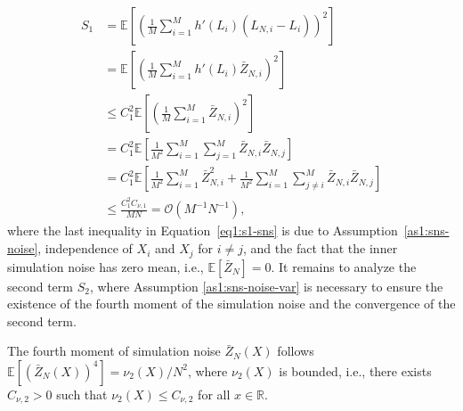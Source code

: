 \begin{align}\label{eq1:s1-sns}
    S_1 
    & = \mathbb{E} \left[ \left(\frac{1}{M} \sum_{i=1}^M h'\left( L_i \right) \left( \hat{L}_{N, i} - L_i \right) \right)^2 \right] \nonumber \\
    & = \mathbb{E} \left[ \left(\frac{1}{M} \sum_{i=1}^M h'\left( L_i \right) \bar{Z}_{N, i} \right)^2 \right] \nonumber \\
    & \leq C_1^2 \mathbb{E} \left[ \left(\frac{1}{M} \sum_{i=1}^M \bar{Z}_{N, i} \right)^2 \right] \nonumber \\
    & = C_1^2 \mathbb{E} \left[ \frac{1}{M^2} \sum_{i=1}^M \sum_{j=1}^M \bar{Z}_{N, i} \bar{Z}_{N, j} \right] \nonumber \\
    & = C_1^2 \mathbb{E} \left[ \frac{1}{M^2} \sum_{i=1}^M \bar{Z}_{N, i}^2 + \frac{1}{M^2} \sum_{i=1}^M \sum_{j \neq i}^M \bar{Z}_{N, i} \bar{Z}_{N, j} \right] \nonumber \\
    & \leq  \frac{C_1^2 C_{\nu, 1}}{MN} = \mathcal{O}(M^{-1} N^{-1}),
\end{align}
where the last inequality in Equation~\eqref{eq1:s1-sns} is due to Assumption~\ref{as1:sns-noise}, independence of $X_i$ and $X_j$ for $i \neq j$, and the fact that the inner simulation noise has zero mean, i.e., $\mathbb{E} \left[ \bar{Z}_N \right] = 0$. 
It remains to analyze the second term $S_2$, where Assumption \ref{as1:sns-noise-var} is necessary to ensure the existence of the fourth moment of the simulation noise and the convergence of the second term.

\begin{assumption}\label{as1:sns-noise-var}
    The fourth moment of simulation noise $\bar{Z}_N(X)$ follows $\mathbb{E} \left[ \left( \bar{Z}_N(X) \right)^4 \right] = \nu_2(X) / N^2$, where $\nu_2(X)$ is bounded, i.e., there exists $C_{\nu,2} > 0$ such that $\nu_2(X) \leq C_{\nu,2}$ for all $x \in \mathbb{R}$.
\end{assumption}

